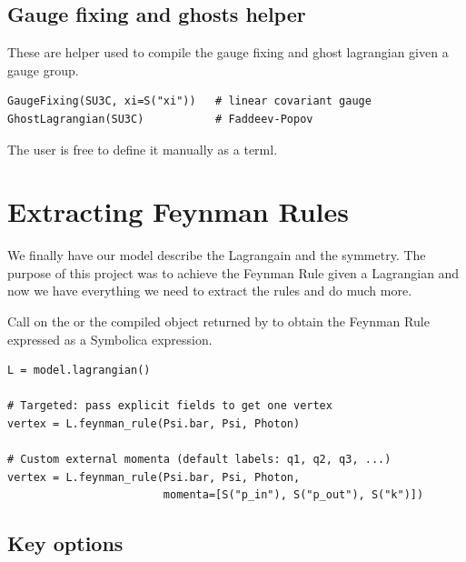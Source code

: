 \subsection*{Gauge fixing and ghosts helper}

These are helper used to compile the gauge fixing and ghost lagrangian given a gauge group.
\begin{verbatim}
GaugeFixing(SU3C, xi=S("xi"))   # linear covariant gauge
GhostLagrangian(SU3C)           # Faddeev-Popov
\end{verbatim}
The user is free to define it manually as a terml.
\section{Extracting Feynman Rules}
\label{sec:feynpy-feynman}

We finally have our model describe the Lagrangain and the symmetry. The purpose of this project was to achieve the Feynman Rule given a Lagrangian and now we have everything we need to extract the rules and do much more.

Call  on the  or the compiled  object returned by
 to obtain the Feynman Rule expressed as a Symbolica expression.

\begin{verbatim}
L = model.lagrangian()

# Targeted: pass explicit fields to get one vertex
vertex = L.feynman_rule(Psi.bar, Psi, Photon)

# Custom external momenta (default labels: q1, q2, q3, ...)
vertex = L.feynman_rule(Psi.bar, Psi, Photon,
                        momenta=[S("p_in"), S("p_out"), S("k")])
\end{verbatim}

\subsection*{Key options}

